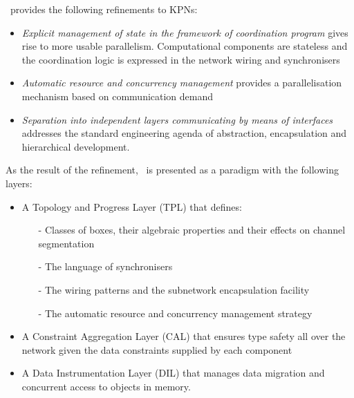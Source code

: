 \ak\ provides the following refinements to KPNs:
\begin{itemize}
\item \emph{Explicit management of state in the framework of coordination program} gives rise to more usable parallelism. Computational components are stateless and the coordination logic is expressed in the network wiring and synchronisers

\item \emph{Automatic resource and concurrency management} provides a parallelisation mechanism based on communication demand

\item \emph{Separation into independent layers communicating by means of interfaces} addresses the standard engineering agenda of abstraction, encapsulation and hierarchical development.
\end{itemize}

As the result of the refinement, \ak\ is presented as a paradigm with the following layers:
\begin{itemize}
\item A Topology and Progress Layer (TPL) that defines:
    \begin{itemize}
\item[-] Classes of boxes, their algebraic properties and their effects on channel segmentation
\item[-] The language of synchronisers
\item[-] The wiring patterns and the subnetwork encapsulation facility
\item[-] The automatic resource and concurrency management strategy
    \end{itemize}

\item A Constraint Aggregation Layer (CAL) that ensures type safety all over the network given the data constraints supplied by each component

\item A Data Instrumentation Layer (DIL) that manages data migration and concurrent access to objects in memory.
\end{itemize}
